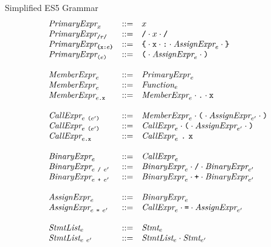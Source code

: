 \documentclass[preprint,10pt]{sigplanconf}
\begin{document}
\begin{displayfigure*}{\label{fig:grammar}Simplified ES5 Grammar}
\[
\begin{array}{lcl}
  \textit{PrimaryExpr}_{x} &::=& x
  \\
  \textit{PrimaryExpr}_{\texttt{/}r\texttt{/}} &::=& \texttt{/} \cdot x \cdot \texttt{/}
  \\
  \textit{PrimaryExpr}_{
    \texttt{\{} \texttt{x} \texttt{:} e \texttt{\}}
  } 
  &::=& 
  \texttt{\{} \cdot \texttt{x} \cdot \texttt{:} \cdot  \textit{AssignExpr}_{e}
    \cdot \texttt{\}}
  \\
  \textit{PrimaryExpr}_{\texttt{(} e \texttt{)}} &::=& 
  \texttt{(} \cdot \textit{AssignExpr}_{e} \cdot \texttt{)}
  \\ \\
  \textit{MemberExpr}_{e} &::=&
  \textit{PrimaryExpr}_{e}
  \\
  \textit{MemberExpr}_{e} &::=&
  \textit{Function}_{e}
  \\
  \textit{MemberExpr}_{e\texttt{.\texttt{x}}} &::=&
  \textit{MemberExpr}_{e} \cdot \texttt{.} \cdot \texttt{x}
  \\ \\
  \textit{CallExpr}_{e~ \texttt{(}e' \texttt{)}} &::=& 
  \textit{MemberExpr}_{e} \cdot
  \texttt{(}\cdot \textit{AssignExpr}_{e'} \cdot \texttt{)}
  \\
  \textit{CallExpr}_{e~ \texttt{(}e' \texttt{)}} &::=& 
  \textit{CallExpr}_{e} \cdot
  \texttt{(}\cdot \textit{AssignExpr}_{e'} \cdot \texttt{)}
  \\
  \textit{CallExpr}_{e\texttt{.\texttt{x}}} &::=& 
  \textit{CallExpr}_{e}~\texttt{.}~
  \texttt{x}
  \\ \\
  \textit{BinaryExpr}_{e} &::=& \textit{CallExpr}_{e} \\
  \textit{BinaryExpr}_{e ~\texttt{/}~ e'}
  &::=&
  \textit{BinaryExpr}_{e} \cdot \texttt{/} \cdot  \textit{BinaryExpr}_{e'} \\
  \textit{BinaryExpr}_{e ~\texttt{+}~ e'}
  &::=&
  \textit{BinaryExpr}_{e} \cdot \texttt{+} \cdot \textit{BinaryExpr}_{e'}
  \\ \\
  \textit{AssignExpr}_{e} &::=&
  \textit{BinaryExpr}_{e}
  \\
  \textit{AssignExpr}_{e~\texttt{=}~e'} &::=&
  \textit{CallExpr}_{e} \cdot \texttt{=} \cdot
  \textit{AssignExpr}_{e'}
  \\ \\
  \textit{StmtList}_{e} &::=&
  \textit{Stmt}_{e}
  \\
  \textit{StmtList}_{e~e'} &::=&
  \textit{StmtList}_{e} \cdot
  \textit{Stmt}_{e'}

\end{array}\]
\end{displayfigure*}
\end{document}
